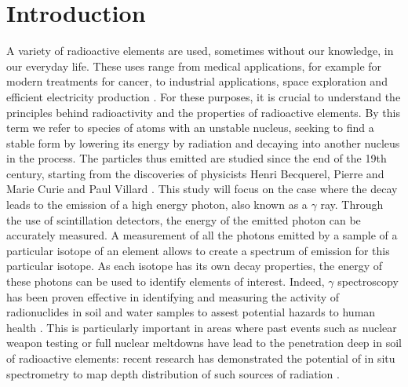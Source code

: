 \section{Introduction}
A variety of radioactive elements are used, sometimes without our knowledge, in our everyday life.
These uses range from medical applications, for example for modern treatments for cancer, to industrial applications, space exploration and efficient electricity production \cite{andrea_galindo_what_2023} \cite{esa_radiation}.
For these purposes, it is crucial to understand the principles behind radioactivity and the properties of radioactive elements.
By this term we refer to species of atoms with an unstable nucleus, seeking to find a stable form by lowering its energy by radiation and decaying into another nucleus in the process.
The particles thus emitted are studied since the end of the 19th century, starting from the discoveries of physicists Henri Becquerel, Pierre and Marie Curie and Paul Villard \cite{britannica_atom}.
This study will focus on the case where the decay leads to the emission of a high energy photon, also known as a \(\gamma\) ray.
Through the use of scintillation detectors, the energy of the emitted photon can be accurately measured.
A measurement of all the photons emitted by a sample of a particular isotope of an element allows to create a spectrum of emission for this particular isotope.
As each isotope has its own decay properties, the energy of these photons can be used to identify elements of interest.
Indeed, $\gamma$ spectroscopy has been proven effective in identifying and measuring the activity of radionuclides in soil and water samples to assest potential hazards to human health \cite{ramadhany_assessment_2022} \cite{kim_design_2022}.
This is particularly important in areas where past events such as nuclear weapon testing or full nuclear meltdowns have lead to the penetration deep in soil of radioactive elements: 
recent research has demonstrated the potential of in situ spectrometry to map depth distribution of such sources of radiation \cite{varley_situ_2017}.
